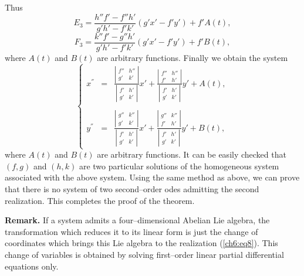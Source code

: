 Thus
\[E_3=\frac{h''f'-f''h'}{g'h'-f'k'}(g'x'-f'y')+f'A(t),\]
\[F_3=\frac{k''f'-g''h'}{g'h'-f'k'}(g'x'-f'y')+f'B(t),\]
where $A(t)$ and $B(t)$ are arbitrary functions. Finally we obtain
the system
\[ \left \{  \begin{array}{ccc}
x^{''}&=& \frac{\left |\begin{array}{cc} f''& h''\\g'& k'\end{array}\right |}
{\left |\begin{array}{cc} f'& h'\\ g'& k'\end{array}\right |}x'+
\frac{\left |\begin{array}{cc} f''& h''\\ f'& h'\end{array}\right |}
{\left |\begin{array}{cc} f'& h'\\ g'& k'\end{array}\right |}y'+ A(t),\\
 & & \\
y^{''} &=& \frac{\left |\begin{array}{cc} g''& k''\\g'& k'\end{array}\right |}
{\left |\begin{array}{cc} f'& h'\\ g'& k'\end{array}\right |}x'+
\frac{\left |\begin{array}{cc} g''& k''\\ f'& h'\end{array}\right |}
{\left |\begin{array}{cc} f'& h'\\ g'& k'\end{array}\right |}y'+ B(t), 
\end{array} \right.\]
where $A(t)$ and $B(t)$ are arbitrary functions. It can be  easily checked
that $(f,g)$ and $(h,k)$ are two particular solutions of the 
homogeneous system  associated with the above system.
Using the same method as above, we can prove that there is no system of 
two second--order odes admitting the second realization. This completes
the proof of the theorem.

{\bf Remark. }  If a system admits a four--dimensional Abelian Lie
algebra, the transformation which reduces it to its linear form
is just the change of coordinates which brings this Lie algebra 
to the realization (\ref{ch6:eq8}).  This change of variables 
is obtained by solving first--order linear partial differential equations only.
